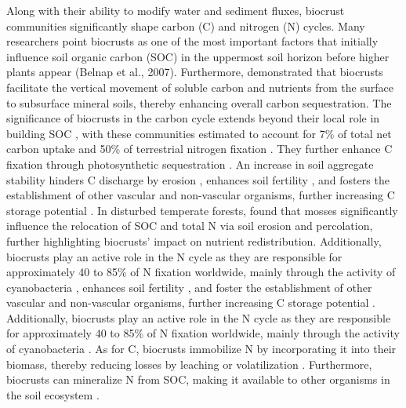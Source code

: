 Along with their ability to modify water and sediment fluxes, biocrust communities significantly shape carbon (C) and nitrogen (N) cycles. Many researchers point biocrusts as one of the most important factors that initially influence soil organic carbon (SOC) in the uppermost soil horizon before higher plants appear (Belnap et al., 2007). Furthermore, \citet{Young2022} demonstrated that biocrusts facilitate the vertical movement of soluble carbon and nutrients from the surface to subsurface mineral soils, thereby enhancing overall carbon sequestration. The significance of biocrusts in the carbon cycle extends beyond their local role in building SOC \citep{Witzgall2024}, with these communities estimated to account for 7\% of total net carbon uptake and 50\% of terrestrial nitrogen fixation \citep{Elbert2012}. They further enhance C fixation through photosynthetic sequestration \citep{Belnap2016,Grote2010}. An increase in soil aggregate stability hinders C discharge by erosion \citep{RiverasMunoz2022,Xiao2022}, enhances soil fertility \citep{Kheirfam2017}, and fosters the establishment of other vascular and non-vascular organisms, further increasing C storage potential \citep{MolinaMontenegro2016}. In disturbed temperate forests, \citet{Gall2022b} found that mosses significantly influence the relocation of SOC and total N via soil erosion and percolation, further highlighting biocrusts’ impact on nutrient redistribution. Additionally, biocrusts play an active role in the N cycle as they are responsible for approximately 40 to 85\% of N fixation worldwide, mainly through the activity of cyanobacteria , enhances soil fertility \citep{Kheirfam2017}, and foster the establishment of other vascular and non-vascular organisms, further increasing C storage potential \citep{MolinaMontenegro2016}. Additionally, biocrusts play an active role in the N cycle as they are responsible for approximately 40 to 85\% of N fixation worldwide, mainly through the activity of cyanobacteria \citep{RodriguezCaballero2018b,Samolov2020}. As for C, biocrusts immobilize N by incorporating it into their biomass, thereby reducing losses by leaching or volatilization \citep{Nevins2020,Pan2021}. Furthermore, biocrusts can mineralize N from SOC, making it available to other organisms in the soil ecosystem \citep{Weber2015}.

